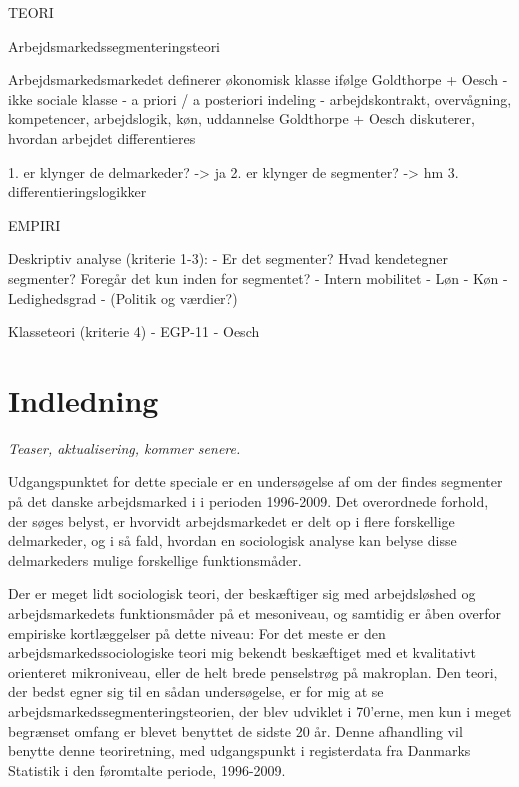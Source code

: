 

TEORI

Arbejdsmarkedssegmenteringsteori 

Arbejdsmarkedsmarkedet definerer økonomisk klasse ifølge Goldthorpe + Oesch
 - ikke sociale klasse
 - a priori / a posteriori indeling
 - arbejdskontrakt, overvågning, kompetencer, arbejdslogik, køn, uddannelse
Goldthorpe + Oesch diskuterer, hvordan arbejdet differentieres

1. er klynger de delmarkeder? -> ja
2. er klynger de segmenter? -> hm
3. differentieringslogikker


EMPIRI

Deskriptiv analyse (kriterie 1-3):
 - Er det segmenter? Hvad kendetegner segmenter? Foregår det kun inden for segmentet?
 - Intern mobilitet
 - Løn
 - Køn
 - Ledighedsgrad
 - (Politik og værdier?)

Klasseteori (kriterie 4)
 - EGP-11
 - Oesch





\chapter{Indledning \label{indledning}}

\emph{Teaser, aktualisering, kommer senere.}

Udgangspunktet for dette speciale er en undersøgelse af om der findes segmenter på det danske arbejdsmarked i i perioden 1996-2009. Det overordnede forhold, der søges belyst, er hvorvidt arbejdsmarkedet er delt op i flere forskellige delmarkeder, og i så fald, hvordan en sociologisk analyse kan belyse disse delmarkeders mulige forskellige funktionsmåder.

Der er meget lidt sociologisk teori, der beskæftiger sig med arbejdsløshed og arbejdsmarkedets funktionsmåder på et mesoniveau, og samtidig er åben overfor empiriske kortlæggelser på dette niveau: For det meste er den arbejdsmarkedssociologiske teori mig bekendt beskæftiget med et kvalitativt orienteret mikroniveau, eller de helt brede penselstrøg på makroplan. Den teori, der bedst egner sig til en sådan undersøgelse, er for mig at se arbejdsmarkedssegmenteringsteorien, der blev udviklet i 70'erne, men kun i meget begrænset omfang er blevet benyttet de sidste 20 år.
Denne afhandling vil benytte denne teoriretning, med udgangspunkt i registerdata fra Danmarks Statistik i den føromtalte periode, 1996-2009.

